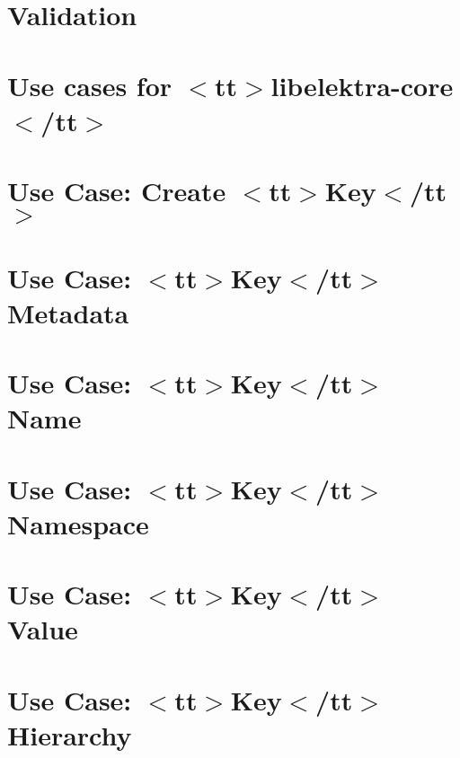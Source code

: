 \let\mypdfximage\pdfximage\def\pdfximage{\immediate\mypdfximage}\documentclass[twoside]{book}
\newcommand{\+}{\discretionary{\mbox{\scriptsize$\hookleftarrow$}}{}{}}
\begin{document}
\chapter{Validation}
\label{doc_tutorials_validation_md}

\chapter{Use cases for $<$tt$>$libelektra-\/core$<$/tt$>$}
\label{doc_usecases_core_README_md}

\chapter{Use Case\+: Create $<$tt$>$Key$<$/tt$>$}
\label{doc_usecases_core_UC_key_create_md}

\chapter{Use Case\+: $<$tt$>$Key$<$/tt$>$ Metadata}
\label{doc_usecases_core_UC_key_meta_md}

\chapter{Use Case\+: $<$tt$>$Key$<$/tt$>$ Name}
\label{doc_usecases_core_UC_key_name_md}

\chapter{Use Case\+: $<$tt$>$Key$<$/tt$>$ Namespace}
\label{doc_usecases_core_UC_key_namespace_md}

\chapter{Use Case\+: $<$tt$>$Key$<$/tt$>$ Value}
\label{doc_usecases_core_UC_key_value_md}

\chapter{Use Case\+: $<$tt$>$Key$<$/tt$>$ Hierarchy}
\label{doc_usecases_core_UC_keyname_hierarchy_md}

\end{document}
